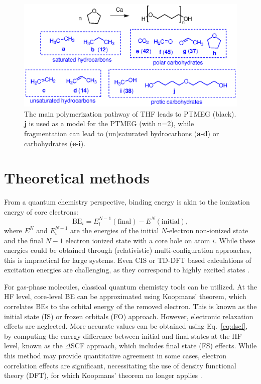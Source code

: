 \documentclass[journal=jpccck,manuscript=article]{achemso}
\begin{document}
\begin{figure}
	\centering
	\includegraphics{Figure1}
	\caption{The main polymerization pathway of THF leads to PTMEG (black). \textbf{j} is used as a model for the PTMEG (with n=2), while fragmentation can lead to (un)saturated hydrocarbons (\textbf{a}-\textbf{d}) or carbohydrates (\textbf{e}-\textbf{i}).}
	\label{fig:THFdegradation}
\end{figure}

\section{Theoretical methods}\label{sec:theo}

From a quantum chemistry perspective, binding energy is akin to the ionization energy of core electrons:
\begin{equation}
	\text{BE}_i = E^{N-1}_i(\text{final}) - E^{N}(\text{initial}), \label{eq:dscf}
\end{equation}
where $E^{N}$ and $E^{N-1}_i$ are the energies of the initial $N$-electron non-ionized state and the final $N-1$ electron ionized state with a core hole on atom $i$. While these energies could be obtained through (relativistic) multi-configuration approaches, this is impractical for large systems. Even CIS or TD-DFT based calculations of excitation energies are challenging, as they correspond to highly excited states \cite{vinesPredictionCoreLevel2018}.

For gas-phase molecules, classical quantum chemistry tools can be utilized. At the HF level, core-level BE can be approximated using Koopmans' theorem, which correlates BEs to the orbital energy of the removed electron. This is known as the initial state (IS) or frozen orbitals (FO) approach.\cite{pueyobellafontPredictionCoreLevel2015} However, electronic relaxation effects are neglected. More accurate values can be obtained using Eq.~\eqref{eq:dscf}, by computing the energy difference between initial and final states at the HF level, known as the $\Delta$SCF approach, which includes final state (FS) effects. While this method may provide quantitative agreement in some cases, electron correlation effects are significant, necessitating the use of density functional theory (DFT), for which Koopmans' theorem no longer applies \cite{pueyobellafontPredictionCoreLevel2015,pueyobellafontPredictingCoreLevel2017,kleinNutsBoltsCorehole2021}.
\end{document}
